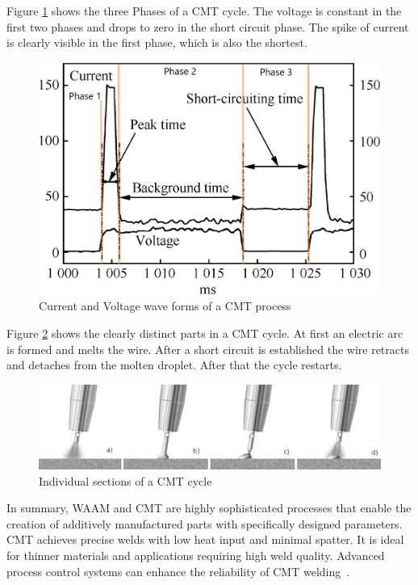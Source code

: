 Figure \ref{fig:CMT} shows the three Phases of a \acrshort{CMT} cycle. The voltage is constant in the first two phases and drops to zero in the short circuit phase. The spike of current is clearly visible in the first phase, which is also the shortest.

\begin{figure}[H]
	\centering
	\includegraphics[width=0.7\linewidth]{figures/CMT.jpg}
	\caption{Current and Voltage wave forms of a CMT process~\cite{Selvi.2018img}}
	\label{fig:CMT}
\end{figure}

\newpage
Figure \ref{fig:CMT2} shows the clearly distinct parts in a \acrshort{CMT} cycle. At first an electric arc is formed and melts the wire. After a short circuit is established the wire retracts and detaches from the molten droplet. After that the cycle restarts.

\begin{figure}[H]
	\centering
	\includegraphics[width=0.9\linewidth]{figures/CMT2.png}
	\caption{Individual sections of a CMT cycle~\cite{Dalton.30122023}}
	\label{fig:CMT2}
\end{figure}


In summary, \acrshort{WAAM} and \acrshort{CMT} are highly sophisticated processes that enable the creation of additively manufactured parts with specifically designed parameters. \acrshort{CMT} achieves precise welds with low heat input and minimal spatter. It is ideal for thinner materials and applications requiring high weld quality. Advanced process control systems can enhance the reliability of \acrshort{CMT} welding~\cite{Rahul.2018, Pickin.2011}.


